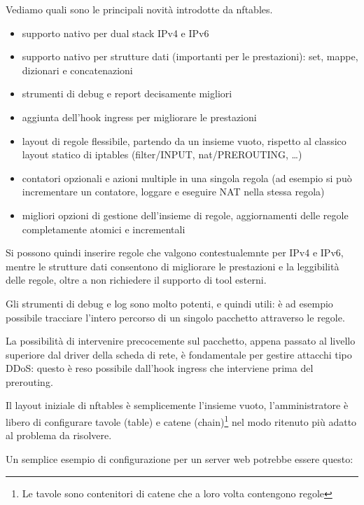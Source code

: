 Vediamo quali sono le principali novit\`a introdotte da nftables.
\begin{itemize}
    \item supporto nativo per dual stack IPv4 e IPv6
    \item supporto nativo per strutture dati (importanti per le prestazioni):
    set, mappe, dizionari e concatenazioni
    \item strumenti di debug e report decisamente migliori
    \item aggiunta dell'hook ingress per migliorare le prestazioni
    \item layout di regole flessibile, partendo da un insieme vuoto, rispetto
    al classico layout statico di iptables (filter/INPUT, nat/PREROUTING,
    \ldots)
    \item contatori opzionali e azioni multiple in una singola regola (ad
    esempio si pu\`o incrementare un contatore, loggare e eseguire NAT nella
    stessa regola)
    \item migliori opzioni di gestione dell'insieme di regole, aggiornamenti
    delle regole completamente atomici e incrementali
\end{itemize}

Si possono quindi inserire regole che valgono contestualemnte per IPv4 e IPv6,
mentre le strutture dati consentono di migliorare le prestazioni e la
leggibilit\`a delle regole, oltre a non richiedere il supporto di tool
esterni.

Gli strumenti di debug e log sono molto potenti, e quindi utili: \`e ad
esempio possibile tracciare l'intero percorso di un singolo pacchetto
attraverso le regole.

La possibilit\`a di intervenire precocemente sul pacchetto, appena passato al
livello superiore dal driver della scheda di rete, \`e fondamentale per
gestire attacchi tipo DDoS: questo \`e reso possibile dall'hook ingress che
interviene prima del prerouting.

Il layout iniziale di nftables \`e semplicemente l'insieme vuoto,
l'amministratore \`e libero di configurare tavole (table) e catene
(chain)\footnote{Le tavole sono contenitori di catene che a loro volta
contengono regole}
nel modo ritenuto pi\`u adatto al problema da risolvere.


Un semplice esempio di configurazione per un server web potrebbe essere
questo:



